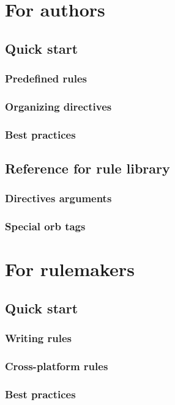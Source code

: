 \documentclass[a4paper,twoside,12pt]{memoir}
\begin{document}
\part{For authors}

\chapter{Quick start}
\section{Predefined rules}
\section{Organizing directives}
\section{Best practices}

\chapter{Reference for rule library}
\section{Directives arguments}
\section{Special orb tags}

\part{For rulemakers}

\chapter{Quick start}
\section{Writing rules}
\section{Cross-platform rules}
\section{Best practices}
\end{document}
